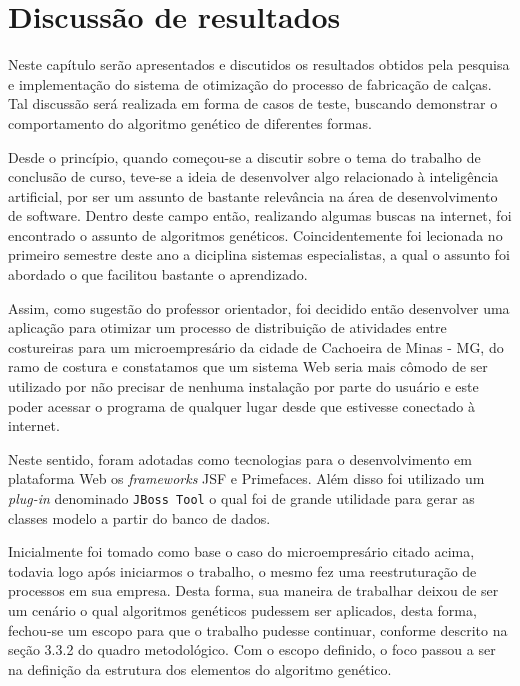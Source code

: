 \chapter{Discussão de resultados}

\par Neste capítulo serão apresentados e discutidos os resultados obtidos pela pesquisa e implementação 
do sistema de otimização do processo de fabricação de calças. Tal discussão será realizada em forma de
casos de teste, buscando demonstrar o comportamento do algoritmo genético de diferentes formas.

\par Desde o princípio, quando começou-se a discutir sobre o tema do 
trabalho de conclusão de curso, teve-se a ideia de desenvolver algo relacionado
à inteligência artificial, por ser um assunto de bastante relevância na área de desenvolvimento de software. 
Dentro deste campo então, realizando algumas buscas na internet, foi encontrado
o assunto de algoritmos genéticos.
Coincidentemente foi lecionada no primeiro semestre deste ano a diciplina
sistemas especialistas, a qual o assunto foi abordado o que facilitou bastante o aprendizado.

\par Assim, como sugestão do professor orientador, foi decidido então
desenvolver uma aplicação para otimizar um processo de distribuição de atividades entre
costureiras para um microempresário da cidade de Cachoeira de Minas - MG, do ramo de costura e constatamos 
que um sistema Web seria mais cômodo de ser utilizado por não precisar de
nenhuma instalação por parte do usuário e este poder acessar o programa de
qualquer lugar desde que estivesse conectado à internet.

Neste sentido, foram adotadas como tecnologias para o desenvolvimento em
plataforma Web os \textit{frameworks} JSF e Primefaces. Além disso foi utilizado
um \textit{plug-in} denominado \texttt{JBoss Tool} o qual foi de grande utilidade para gerar as classes 
modelo a partir do banco de dados.

\par Inicialmente foi tomado como base o caso do microempresário citado acima,
todavia logo após iniciarmos o trabalho, o mesmo fez uma reestruturação de processos em sua empresa. 
Desta forma, sua maneira de trabalhar deixou de ser um cenário o qual algoritmos genéticos
pudessem ser aplicados, desta forma, fechou-se um escopo para que o trabalho
pudesse continuar, conforme descrito na seção 3.3.2 do quadro metodológico. Com
o escopo definido, o foco passou a ser na definição da estrutura dos elementos do algoritmo genético.



